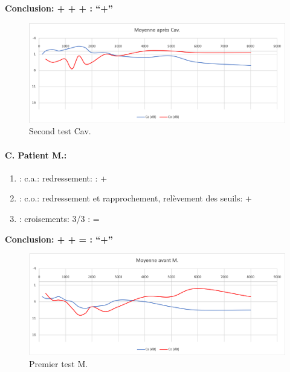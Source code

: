                 \textbf{  Conclusion:  + + +       : ``+''}

                \begin{figure}
\centering
\includegraphics[width=0.7\linewidth]{images/graphiques/cav_post.png}
\caption[Moyenne OG+OD]{Second test Cav.}

                \end{figure}




               \paragraph{ C. Patient M.:}


	\begin{enumerate}

 		\item : c.a.: redressement: : +   %

 		\item : c.o.: redressement et rapprochement,
                  relèvement des seuils:  +     %
 		\item : croisements: 3/3 :  =

                \end{enumerate}

                \textbf{  Conclusion:  +  +  =     : ``+''}

                \begin{figure}
\centering
\includegraphics[width=0.7\linewidth]{images/graphiques/m_pre.png}
\caption[Moyenne OG+OD]{Premier test M.}

\end{figure}


